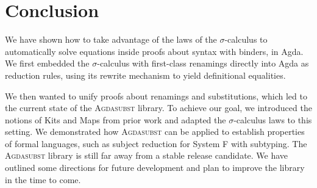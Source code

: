 \documentclass[screen,nonacm]{acmart}
\begin{document}
\section{Conclusion}\label{sec:con}
We have shown how to take advantage of the laws of the $\sigma$-calculus to
automatically solve equations inside proofs about syntax with binders, in Agda.
We first embedded the $\sigma$-calculus with first-class renamings directly
into Agda as reduction rules, using its rewrite mechanism to yield definitional
equalities.

We then wanted to unify proofs about renamings and substitutions, which led to
the current state of the \textsc{Agdasubst} library. To achieve our goal, we
introduced the notions of Kits and Maps from prior work and adapted the
$\sigma$-calculus laws to this setting. We demonstrated how \textsc{Agdasubst}
can be applied to establish properties of formal languages, such as subject
reduction for System F with subtyping. The \textsc{Agdasubst} library is still
far away from a stable release candidate. We have outlined some directions for
future development and plan to improve the library in the time to come.



\end{document}
